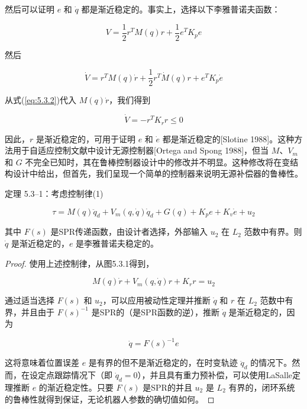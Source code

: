 \documentclass[UTF8,12pt,a4paper]{ctexart}
\begin{document}
然后可以证明 $e$ 和 $\dot{q}$ 都是渐近稳定的。事实上，选择以下李雅普诺夫函数：

\begin{equation}
V = \frac{1}{2}r^T M(q)r + \frac{1}{2}e^T K_p e
\end{equation}

然后

\begin{equation}
\dot{V} = r^T M(q)\dot{r} + \frac{1}{2}r^T \dot{M}(q)r + e^T K_p \dot{e}
\end{equation}

从式(\ref{eq:5.3.2})代入 $M(q)\dot{r}$，我们得到

\begin{equation}
\dot{V} = -r^T K_r r \leq 0
\end{equation}

因此，$r$ 是渐近稳定的，可用于证明 $e$ 和 $\dot{e}$ 都是渐近稳定的[Slotine 1988]。这种方法用于自适应控制文献中设计无源控制器[Ortega and Spong 1988]，但当 $M$、$V_m$ 和 $G$ 不完全已知时，其在鲁棒控制器设计中的修改并不明显。这种修改将在变结构设计中给出，但首先，我们呈现一个简单的控制器来说明无源补偿器的鲁棒性。

\begin{theorem}\label{thm:5.3.1}
定理 5.3--1：考虑控制律(1)

\begin{equation}
\tau = M(q)\ddot{q}_d + V_m(q, \dot{q})\dot{q}_d + G(q) + K_p e + K_v \dot{e} + u_2
\end{equation}

其中 $F(s)$ 是SPR传递函数，由设计者选择，外部输入 $u_2$ 在 $L_2$ 范数中有界。则 $\dot{q}$ 是渐近稳定的，$e$ 是李雅普诺夫稳定的。
\end{theorem}

\begin{proof}
使用上述控制律，从图5.3.1得到，

\begin{equation}
M(q)\dot{r} + V_m(q, \dot{q})r + K_r r = u_2
\end{equation}

通过适当选择 $F(s)$ 和 $u_2$，可以应用被动性定理并推断 $\dot{q}$ 和 $r$ 在 $L_2$ 范数中有界，并且由于 $F(s)^{-1}$ 是SPR的（是SPR函数的逆），推断 $\dot{q}$ 是渐近稳定的，因为

\begin{equation}
\dot{q} = F(s)^{-1}e
\end{equation}

这将意味着位置误差 $e$ 是有界的但不是渐近稳定的，在时变轨迹 $\ddot{q}_d$ 的情况下。然而，在设定点跟踪情况下（即 $\dot{q}_d = 0$），并且具有重力预补偿，可以使用LaSalle定理推断 $e$ 的渐近稳定性。只要 $F(s)$ 是SPR的并且 $u_2$ 是 $L_2$ 有界的，闭环系统的鲁棒性就得到保证，无论机器人参数的确切值如何。
\end{proof}
\end{document}
